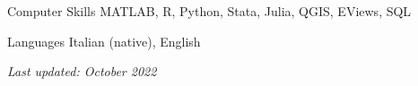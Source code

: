\documentclass{resume} %
\begin{document}

\begin{rSection}{Computer Skills}
MATLAB, R, Python, Stata, Julia, QGIS, EViews, SQL
\end{rSection}


\begin{rSection}{Languages}
Italian (native), English
\end{rSection}

\vspace{0.5cm}

\hfill {\em Last updated: October 2022}
\end{document}

